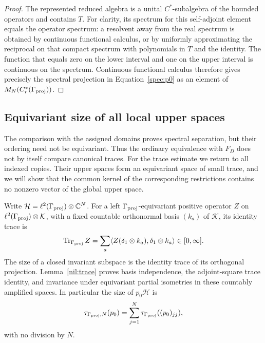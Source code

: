 \begin{proof}
The represented reduced algebra is a unital $C^*$-subalgebra of the
bounded operators and contains $T$.  For clarity, its spectrum for this
self-adjoint element equals the operator spectrum: a resolvent away
from the real spectrum is obtained by continuous functional calculus,
or by uniformly approximating the reciprocal on that compact spectrum
with polynomials in $T$ and the identity.  The function that equals zero
on the lower interval and one on the upper interval is continuous on
the spectrum.  Continuous functional calculus therefore gives precisely
the spectral projection in Equation~\eqref{spec:p0} as an element of
$M_N(C_r^*(\Gamma_{\mathrm{proj}}))$.
\end{proof}

\subsection{Equivariant size of all local upper spaces}

The comparison with the assigned domains proves spectral separation, but
their ordering need not be equivariant. Thus the ordinary equivalence with
$F_D$ does not by itself compare canonical traces. For the trace estimate
we return to all indexed copies. Their upper spaces form an equivariant
space of small trace, and we will show that the common kernel of the
corresponding restrictions contains no nonzero vector of the global upper space.

Write $\mathcal H=\ell^2(\Gamma_{\mathrm{proj}})\otimes\mathbb C^N$. For a left
$\Gamma_{\mathrm{proj}}$-equivariant positive operator $Z$ on
$\ell^2(\Gamma_{\mathrm{proj}})\otimes\mathcal K$, with a fixed countable orthonormal
basis $(k_a)$ of $\mathcal K$, its identity trace is
\begin{equation}
 \operatorname{Tr}_{\Gamma_{\mathrm{proj}}} Z
       =\sum_a\langle Z(\delta_1\otimes k_a),
                              \delta_1\otimes k_a\rangle\in[0,\infty].
 \label{spec:equivariant-trace}
\end{equation}
The size of a closed invariant subspace is the identity trace of its
orthogonal projection. Lemma~\ref{nil:trace} proves basis independence,
the adjoint-square trace identity, and invariance under equivariant
partial isometries in these countably amplified spaces. In particular
the size of $p_0\mathcal H$ is
\[
 \tau_{\Gamma_{\mathrm{proj}},N}(p_0)
    =\sum_{j=1}^N\tau_{\Gamma_{\mathrm{proj}}}((p_0)_{jj}),
\]
with no division by $N$.

